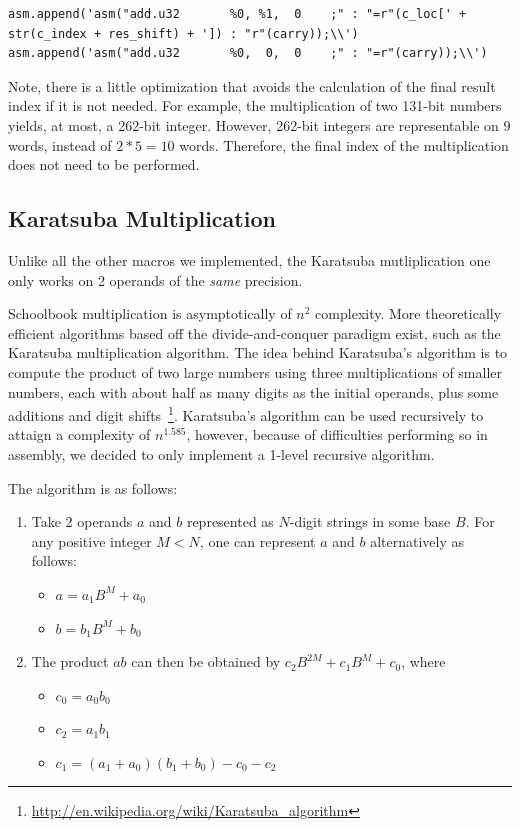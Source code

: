 \documentclass[12pt, a4paper]{report}
\begin{document}
\begin{enumerate}
\begin{lstlisting}
asm.append('asm("add.u32       %0, %1,  0    ;" : "=r"(c_loc[' + str(c_index + res_shift) + ']) : "r"(carry));\\')
asm.append('asm("add.u32       %0,  0,  0    ;" : "=r"(carry));\\')
\end{lstlisting}
\end{enumerate}

Note, there is a little optimization that avoids the calculation of the final
result index if it is not needed.
For example, the multiplication of two 131-bit numbers yields, at most, a
262-bit integer.
However, 262-bit integers are representable on 9 words, instead of
$2*5 = 10$ words.
Therefore, the final index of the multiplication does not need to be performed.

\subsection{Karatsuba Multiplication}
Unlike all the other macros we implemented, the Karatsuba mutliplication one
only works on 2 operands of the \emph{same} precision.

Schoolbook multiplication is asymptotically of $n^2$ complexity.
More theoretically efficient algorithms based off the divide-and-conquer
paradigm exist, such as the Karatsuba multiplication algorithm.
The idea behind Karatsuba's algorithm is to compute the product of two large
numbers using three multiplications of smaller numbers, each with about half as
many digits as the initial operands, plus some additions and digit shifts~\footnote{\url{http://en.wikipedia.org/wiki/Karatsuba_algorithm}}.
Karatsuba's algorithm can be used recursively to attaign a complexity of
$n^{1.585}$, however, because of difficulties performing so in assembly, we
decided to only implement a 1-level recursive algorithm.

The algorithm is as follows:
\begin{enumerate}
\item Take 2 operands $a$ and $b$ represented as $N$-digit strings in some base
$B$.
For any positive integer $M < N$, one can represent $a$ and $b$ alternatively as
follows:
\begin{itemize}
\item $a = a_1 B^M + a_0$
\item $b = b_1 B^M + b_0$
\end{itemize}
\item The product $ab$ can then be obtained by
$c_2 B^{2M} + c_1 B^{M} + c_0$, where
\begin{itemize}
\item $c_0 = a_0 b_0$
\item $c_2 = a_1 b_1$
\item $c_1 = (a_1 + a_0) (b_1 + b_0) - c_0 - c_2$
\end{itemize}
\end{enumerate}
\end{document}
